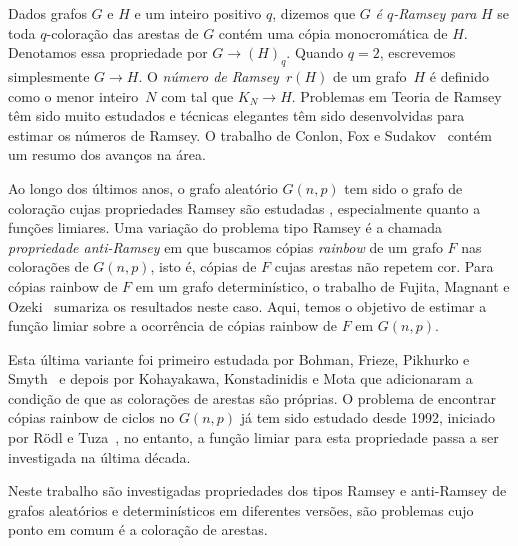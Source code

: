 \documentclass[12pt,a4paper]{book}
\begin{document}

Dados grafos $G$ e $H$ e um inteiro positivo $q$, dizemos que $G$
\emph{é $q$-Ramsey para} $H$ se toda $q$-coloração das arestas de $G$ contém uma cópia monocromática de $H$.
Denotamos essa propriedade por $G\rightarrow (H)_q$.
Quando $q=2$, escrevemos simplesmente $G\rightarrow H$.
O \emph{número de Ramsey}~$r(H)$ de um grafo~$H$ é definido como o menor inteiro~$N$ com tal que $K_N \rightarrow H$.
Problemas em Teoria de Ramsey têm sido muito estudados e técnicas elegantes têm sido desenvolvidas  para estimar os números de Ramsey.
O trabalho de Conlon, Fox e Sudakov~\cite{CoFoSu15} contém um resumo  dos avanços na área.

Ao longo dos últimos anos, o grafo aleatório $G(n,p)$ tem sido o grafo de coloração cujas propriedades Ramsey são estudadas \cite{rodl1993lower, rodl1995threshold}, especialmente quanto a funções limiares. 
Uma variação do problema tipo Ramsey é a chamada \textit{propriedade anti-Ramsey} em que buscamos cópias \textit{rainbow} de um grafo $F$ nas colorações de $G(n,p)$, isto é, cópias de $F$ cujas arestas não repetem cor.
Para cópias rainbow de $F$ em um grafo determinístico, o trabalho  de Fujita, Magnant e Ozeki~\cite{fujita2010rainbow} sumariza os resultados neste caso.
Aqui, temos o objetivo de estimar a função limiar sobre a ocorrência de cópias rainbow de $F$ em $G(n,p)$. 

Esta última variante foi primeiro estudada por Bohman, Frieze, Pikhurko e Smyth~\cite{bohman10:_aR_rgs} e depois por  Kohayakawa, Konstadinidis e Mota \cite{KoKoMo12} que adicionaram a condição de que as colorações de arestas são próprias.
 O problema de encontrar cópias rainbow de ciclos no $G(n,p)$ já tem sido estudado desde 1992, iniciado por Rödl e Tuza~\cite{roedl92:_rainb}, no entanto, a função limiar para esta  propriedade passa a ser investigada na última década.

Neste trabalho 
são investigadas propriedades dos tipos Ramsey e anti-Ramsey
de grafos aleatórios e determinísticos em diferentes versões, são problemas cujo ponto em comum é a coloração de arestas.
\end{document}
